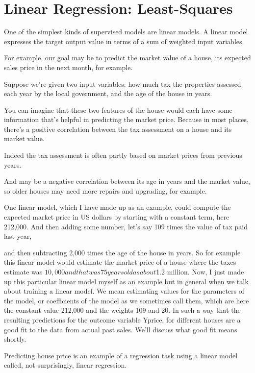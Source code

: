 \section{Linear Regression: Least-Squares}
\begin{multicols}{2}

One of the simplest kinds of supervised models are linear models. A linear model expresses the target output value in terms of a sum of weighted input variables. 

For example, our goal may be to predict the market value of a house, its expected sales price in the next month, for example. 

Suppose we're given two input variables: how much tax the properties assessed each year by the local government, and the age of the house in years. 

You can imagine that these two features of the house would each have some information that's helpful in predicting the market price. Because in most places, there's a positive correlation between the tax assessment on a house and its market value. 

Indeed the tax assessment is often partly based on market prices from previous years. 

And may be a negative correlation between its age in years and the market value, so older houses may need more repairs and upgrading, for example. 

One linear model, which I have made up as an example, could compute the expected market price in US dollars by starting with a constant term, here 212,000. And then adding some number, let's say 109 times the value of tax paid last year, 

and then subtracting 2,000 times the age of the house in years. So for example this linear model would estimate the market price of a house where the taxes estimate was $10,000 and that was 75 years old as about $1.2 million. Now, I just made up this particular linear model myself as an example but in general when we talk about training a linear model. We mean estimating values for the parameters of the model, or coefficients of the model as we sometimes call them, which are here the constant value 212,000 and the weights 109 and 20. In such a way that the resulting predictions for the outcome variable Yprice, for different houses are a good fit to the data from actual past sales. We'll discuss what good fit means shortly. 

Predicting house price is an example of a regression task using a linear model called, not surprisingly, linear regression. 


\end{multicols}
